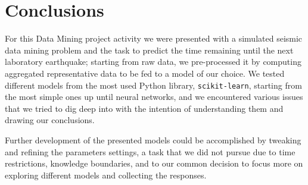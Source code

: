 \chapter{Conclusions}
\label{conclusioni}
\thispagestyle{empty}

\noindent For this Data Mining project activity we were presented with a simulated seismic data mining problem and the task to predict the time remaining until the next laboratory earthquake; starting from raw data, we pre-processed it by computing aggregated representative data to be fed to a model of our choice. We tested different models from the most used Python library, \texttt{scikit-learn}, starting from the most simple ones up until neural networks, and we encountered various issues that we tried to dig deep into with the intention of understanding them and drawing our conclusions.

Further development of the presented models could be accomplished by tweaking and refining the parameters settings, a task that we did not pursue due to time restrictions, knowledge boundaries, and to our common decision to focus more on exploring different models and collecting the responses.